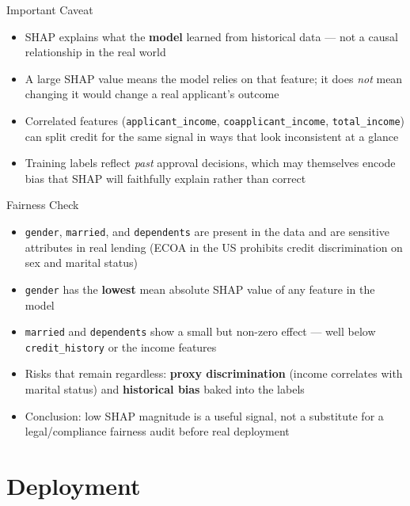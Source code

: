 \documentclass[aspectratio=169]{beamer}
\begin{document}
\begin{frame}{Important Caveat}
    \begin{itemize}
        \item SHAP explains what the \textbf{model} learned from historical data --- not a causal relationship in the real world
        \item A large SHAP value means the model relies on that feature; it does \emph{not} mean changing it would change a real applicant's outcome
        \item Correlated features (\texttt{applicant\_income}, \texttt{coapplicant\_income}, \texttt{total\_income}) can split credit for the same signal in ways that look inconsistent at a glance
        \item Training labels reflect \emph{past} approval decisions, which may themselves encode bias that SHAP will faithfully explain rather than correct
    \end{itemize}
\end{frame}

\begin{frame}{Fairness Check}
    \begin{itemize}
        \item \texttt{gender}, \texttt{married}, and \texttt{dependents} are present in the data and are sensitive attributes in real lending (ECOA in the US prohibits credit discrimination on sex and marital status)
        \item \texttt{gender} has the \textbf{lowest} mean absolute SHAP value of any feature in the model
        \item \texttt{married} and \texttt{dependents} show a small but non-zero effect --- well below \texttt{credit\_history} or the income features
        \item Risks that remain regardless: \textbf{proxy discrimination} (income correlates with marital status) and \textbf{historical bias} baked into the labels
        \item Conclusion: low SHAP magnitude is a useful signal, not a substitute for a legal/compliance fairness audit before real deployment
    \end{itemize}
\end{frame}

\section{Deployment}
\end{document}
